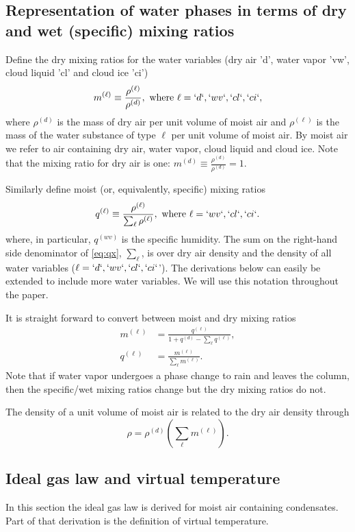 \documentclass{agujournal}
\begin{document}
\subsection{Representation of water phases in terms of dry and wet (specific) mixing ratios}\label{sec:mixing_ratios}
Define the dry mixing ratios for the water variables (dry air 'd', water vapor 'vw', cloud liquid 'cl' and cloud ice 'ci')
\begin{equation}
m^{(\ell)}\equiv \frac{\rho^{(\ell)}}{\rho^{(d)}}, \text{ where }\ell=`d`,`wv`,`cl`,`ci`,\label{eq:mx}
\end{equation}
where $\rho^{(d)}$ is the mass of dry air per unit volume of moist air and $\rho^{(\ell)}$ is the mass of the water substance of type $\ell$ per unit volume of moist air. By moist air we refer to air containing dry air, water vapor, cloud liquid and cloud ice. Note that  the mixing ratio for dry air is one: $m^{(d)}\equiv \frac{\rho^{(d)}}{\rho^{(d)}}=1$. 

Similarly define moist (or, equivalently, specific) mixing ratios
\begin{equation}
q^{(\ell)}\equiv \frac{\rho^{(\ell)}}{\sum_\ell \rho^{(\ell)}}, \text{ where }\ell=`wv`,`cl`,`ci`\label{eq:qx}.
\end{equation}
where, in particular, $q^{(wv)}$ is the specific humidity. The sum on the right-hand side denominator of \eqref{eq:qx}, $\sum_\ell$, is over dry air density and the density of all water variables ($\ell=`d`,`wv`,`cl`,`ci`$'). The derivations below can easily be extended to include more water variables. We will use this notation throughout the paper.

It is straight forward to convert between moist and dry mixing ratios
\begin{align}
m^{(\ell)}&=\frac{q^{(\ell)}}{1+q^{(d)}-\sum_\ell q^{(\ell)}},\label{eq:mxqx}\\
q^{(\ell)}&=\frac{m^{(\ell)}}{\sum_\ell m^{(\ell)}}.
\end{align}
Note that if water vapor undergoes a phase change to rain and leaves the column, then the specific/wet mixing ratios change but the dry mixing ratios do not.

The density of a unit volume of moist air is related to the dry air density through
\begin{equation}
\rho=\rho^{(d)}\left(\sum_\ell m^{(\ell)}\right).
\end{equation}
%
\subsection{Ideal gas law and virtual temperature}\label{sec:tv}
In this section the ideal gas law is derived for moist air containing condensates. Part of that derivation is the definition of virtual temperature. 
\end{document}
